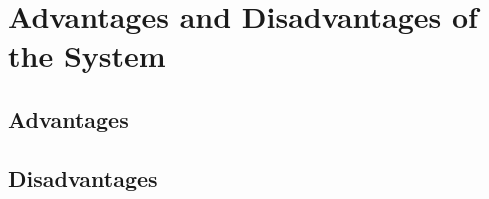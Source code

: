 \chapter{Advantages and Disadvantages of the System}
\ifpdf
    \graphicspath{{Chapter3/Chapter3Figs/PNG/}{Chapter3/Chapter3Figs/PDF/}{Chapter3/Chapter3Figs/}}
\else
    \graphicspath{{Chapter3/Chapter3Figs/EPS/}{Chapter3/Chapter3Figs/}}
\fi


\section{Advantages}

\section{Disadvantages}
